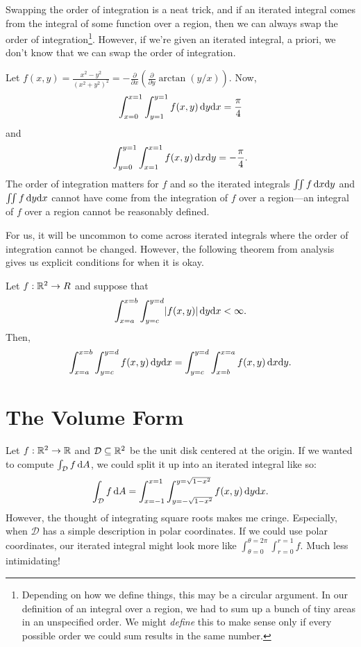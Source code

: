 Swapping the order of integration is a neat trick, and if an
iterated integral comes from the integral of some function over a
region, then we can always swap the order of integration\footnote{ Depending
on how we define things, this may be a circular argument.  In our definition
of an integral over a region, we had to sum up a bunch of tiny areas in an unspecified
order.  We might \emph{define} this to make sense only if every possible order we could
sum results in the same number.}.  However, if we're given an iterated integral,
a priori, we don't know that we can swap the order of integration.

\begin{example}
	Let $f(x,y)=\frac{x^2-y^2}{(x^2+y^2)^2} = 
	-\tfrac{\partial}{\partial x}\left(\tfrac{\partial}{\partial y}\arctan(y/x)\right)$.  Now,
	\[
		\int_{x=0}^{x=1}\int_{y=1}^{y=1} f(x,y)\,\mathrm{d} y\mathrm{d} x = \frac{\pi}{4}
	\]
	and
	\[
		\int_{y=0}^{y=1}\int_{x=1}^{x=1} f(x,y)\,\mathrm{d} x\mathrm{d} y = -\frac{\pi}{4}.
	\]
	The order of integration matters for $f$ and so the iterated integrals $\iint f\, \mathrm{d} x\mathrm{d} y$
	and $\iint f\,\mathrm{d} y\mathrm{d} x$ cannot have come from the integration of $f$ over a region---an
	integral of $f$ over a region cannot be reasonably defined.
\end{example}

For us, it will be uncommon to come across iterated integrals where the order of integration
cannot be changed.  However, the following theorem from analysis gives us explicit conditions
for when it is okay.

\begin{theorem}
	Let $f:\mathbb{R}^2\to R$ and suppose that 
	\[
		\int_{x=a}^{x=b}\int_{y=c}^{y=d} \lvert f(x,y)\rvert\,\mathrm{d} y\mathrm{d} x < \infty.
	\]
	Then,
	\[
		\int_{x=a}^{x=b}\int_{y=c}^{y=d} f(x,y)\,\mathrm{d} y\mathrm{d} x =
		\int_{y=c}^{y=d}\int_{x=b}^{x=a} f(x,y)\,\mathrm{d} x\mathrm{d} y.
	\]
\end{theorem}

\begin{exercises}
\end{exercises}

\section{The Volume Form}

Let $f:\mathbb{R}^2\to \mathbb{R}$ and $\mathcal D\subseteq \mathbb{R}^2$ be the unit disk centered at the origin.
If we wanted to compute $\int_{\mathcal D} f\,\mathrm{d} A$, we could split it up into an iterated
integral like so:
\[
	\int_{\mathcal D} f\,\mathrm{d} A = \int_{x=-1}^{x=1}\int_{y=-\sqrt{1-x^2}}^{y=\sqrt{1-x^2}} f(x,y)\,\mathrm{d} y\mathrm{d} x.
\]
However, the thought of integrating square roots makes me cringe.  Especially, when $\mathcal D$ has
a simple description in polar coordinates.  If we could use polar coordinates, our iterated
integral might look more like $\int_{\theta=0}^{\theta=2\pi}\int_{r=0}^{r=1} f$.  Much less intimidating!

